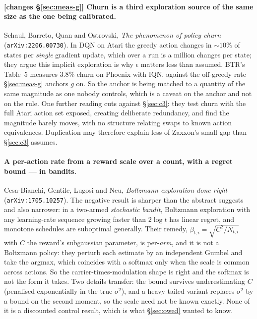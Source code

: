 \documentclass{article}
\begin{document}
\paragraph{\textbf{[changes \S\ref{sec:meas-g}]} Churn is a third exploration source of the same
size as the one being calibrated.} Schaul, Barreto, Quan and Ostrovski, \emph{The phenomenon of
policy churn} (\texttt{arXiv:2206.00730}). In DQN on Atari the greedy action changes in
${\sim}10\%$ of states per \emph{single} gradient update, which over a run is a million changes
per state; they argue this implicit exploration is why $\epsilon$ matters less than assumed. BTR's
Table~5 measures $3.8\%$ churn on Phoenix with IQN, against the off-greedy rate
\S\ref{sec:meas-g} anchors $g$ on. So the anchor is being matched to a quantity of the same
magnitude as one nobody controls, which is a caveat on the anchor and not on the rule. One
further reading cuts against \S\ref{sec:c3}: they test churn with the full Atari action set
exposed, creating deliberate redundancy, and find the magnitude barely moves, with no structure
relating swaps to known action equivalences. Duplication may therefore explain less of Zaxxon's
small gap than \S\ref{sec:c3} assumes.

\paragraph{A per-action rate from a reward scale over a count, with a regret bound --- in
bandits.} Cesa-Bianchi, Gentile, Lugosi and Neu, \emph{Boltzmann exploration done right}
(\texttt{arXiv:1705.10257}). The negative result is sharper than the abstract suggests and also
narrower: in a two-armed \emph{stochastic bandit}, Boltzmann exploration with any learning-rate
sequence growing faster than $2\log t$ has linear regret, and monotone schedules are suboptimal
generally. Their remedy, $\beta_{t,i} = \sqrt{C^2/N_{t,i}}$ with $C$ the reward's subgaussian
parameter, is per-\emph{arm}, and it is not a Boltzmann policy: they perturb each estimate by an
independent Gumbel and take the argmax, which coincides with a softmax only when the scale is
common across actions. So the carrier-times-modulation shape is right and the softmax is not the
form it takes. Two details transfer: the bound survives underestimating $C$ (penalised
exponentially in the true $\sigma^2$), and a heavy-tailed variant replaces $\sigma^2$ by a bound
on the second moment, so the scale need not be known exactly. None of it is a discounted control
result, which is what \S\ref{sec:owed} wanted to know.
\end{document}
